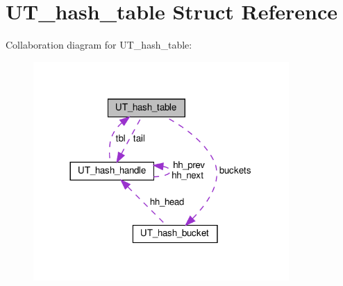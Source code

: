 \hypertarget{structUT__hash__table}{}\section{U\+T\+\_\+hash\+\_\+table Struct Reference}
\label{structUT__hash__table}


Collaboration diagram for U\+T\+\_\+hash\+\_\+table\+:
\nopagebreak
\begin{figure}[H]
\begin{center}
\leavevmode
\includegraphics[width=276pt]{structUT__hash__table__coll__graph}
\end{center}
\end{figure}

